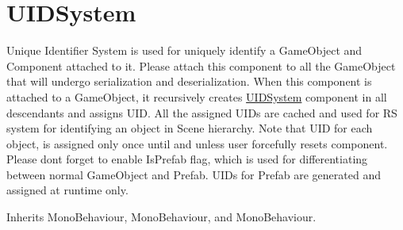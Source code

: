 \hypertarget{class_voxel_busters_1_1_runtime_serialization_1_1_u_i_d_system}{}\section{U\+I\+D\+System}
\label{class_voxel_busters_1_1_runtime_serialization_1_1_u_i_d_system}


Unique Identifier System is used for uniquely identify a Game\+Object and Component attached to it. Please attach this component to all the Game\+Object that will undergo serialization and deserialization. When this component is attached to a Game\+Object, it recursively creates \hyperlink{class_voxel_busters_1_1_runtime_serialization_1_1_u_i_d_system}{U\+I\+D\+System} component in all descendants and assigns U\+I\+D. All the assigned U\+I\+D\textquotesingle{}s are cached and used for R\+S system for identifying an object in Scene hierarchy. Note that U\+I\+D for each object, is assigned only once until and unless user forcefully reset\textquotesingle{}s component. Please dont forget to enable Is\+Prefab flag, which is used for differentiating between normal Game\+Object and Prefab. U\+I\+D\textquotesingle{}s for Prefab are generated and assigned at runtime only.  




Inherits Mono\+Behaviour, Mono\+Behaviour, and Mono\+Behaviour.


